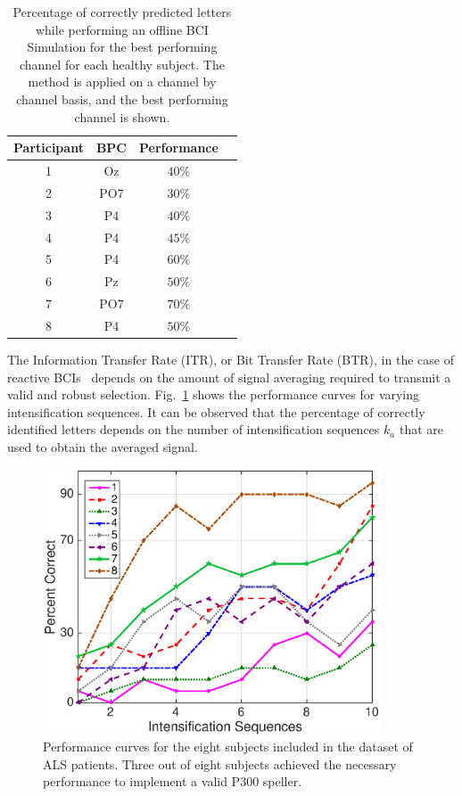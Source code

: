 \documentclass[entropy,article,submit,moreauthors,pdftex,10pt,a4paper]{mdpi}
\begin{document}
\begin{table}[H]
\caption{Percentage of correctly predicted letters while performing an offline BCI Simulation for the best performing channel for each healthy subject. The method is applied on a channel by channel basis, and the best performing channel is shown. }
\centering
\begin{tabular}{cccc}
\toprule
\textbf{Participant}	&  \textbf{BPC}	& \textbf{Performance}\\
\midrule
1     &     Oz   &     $40\%$  \\
2     &     PO7   &     $30\%$ \\
3     &     P4   &     $40\%$ \\
4     &     P4   &     $45\%$ \\
5     &     P4   &      $60\%$ \\
6     &     Pz   &      $50\%$ \\
7     &     PO7   &      $70\%$ \\
8     &     P4   &      $50\%$ \\

\bottomrule
\end{tabular}
\label{tab:resultsowndataset}
\end{table}


The Information Transfer Rate (ITR), or Bit Transfer Rate (BTR), in the case of reactive BCIs~\citep{WolpawJonathanR2012}  depends on the amount of signal averaging required to transmit a valid and robust selection.  Fig.~\ref{fig:performance} shows the performance curves for varying intensification sequences. It can be observed that the percentage of correctly identified letters depends on the number of intensification sequences $k_a$ that are used to obtain the averaged signal.


\begin{figure}[H]
\centering
\includegraphics[width=10cm]{performance2.eps}
\caption{Performance curves for the eight subjects included in the dataset of ALS patients.  Three out of eight subjects achieved the necessary performance to implement a valid P300 speller.}
\label{fig:performance}
\end{figure}
\end{document}
